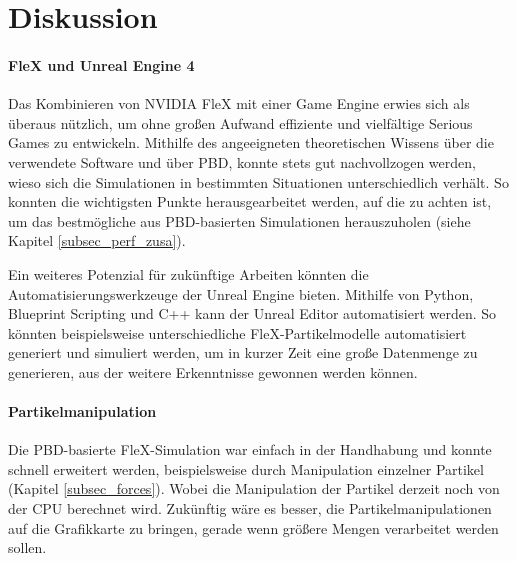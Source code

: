 \chapter{Diskussion}


\subsubsection{FleX und Unreal Engine 4}
Das Kombinieren von NVIDIA FleX mit einer Game Engine erwies sich als überaus nützlich, um ohne großen Aufwand effiziente und vielfältige Serious Games zu entwickeln. 
Mithilfe des angeeigneten theoretischen Wissens über die verwendete Software und über PBD, konnte stets gut nachvollzogen werden, wieso sich die Simulationen in bestimmten Situationen unterschiedlich verhält. 
So konnten die wichtigsten Punkte herausgearbeitet werden, auf die zu achten ist, um das bestmögliche aus PBD-basierten Simulationen herauszuholen (siehe Kapitel \ref{subsec_perf_zusa}).


Ein weiteres Potenzial für zukünftige Arbeiten könnten die Automatisierungswerkzeuge der Unreal Engine bieten. Mithilfe von Python, Blueprint Scripting und C++ kann der Unreal Editor automatisiert werden. So könnten beispielsweise unterschiedliche FleX-Partikelmodelle automatisiert generiert und simuliert werden, um in kurzer Zeit eine große Datenmenge zu generieren, aus der weitere Erkenntnisse gewonnen werden können.

\subsubsection{Partikelmanipulation}
Die PBD-basierte FleX-Simulation war einfach in der Handhabung und konnte schnell erweitert werden, beispielsweise durch Manipulation einzelner Partikel (Kapitel \ref{subsec_forces}). Wobei die Manipulation der Partikel derzeit noch von der CPU berechnet wird. Zukünftig wäre es besser, die Partikelmanipulationen auf die Grafikkarte zu bringen, gerade wenn größere Mengen verarbeitet werden sollen. 

